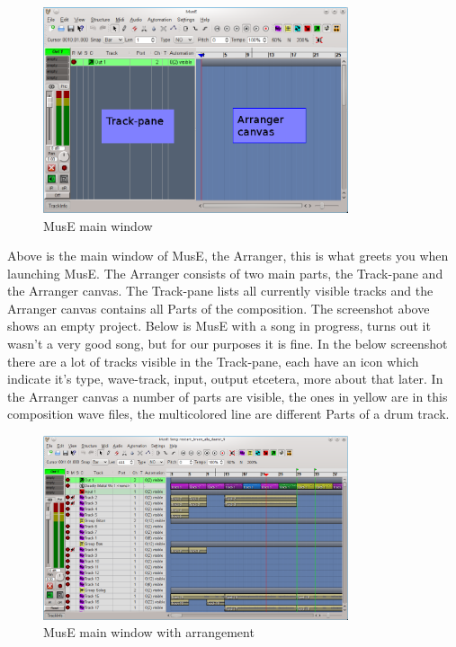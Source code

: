 \documentclass[a4paper]{report}
\newcommand{\screenshotwidth}[0]{0.8\textwidth}
\begin{document}
\label{Main/Arranger} 
\begin{figure}[htp]
\centering \includegraphics[width=\screenshotwidth]
{pics/main_window_annotated} 
\caption{MusE main window}
\label{fig:Main Window} 
\end{figure}
Above is the main window of MusE, the Arranger, this is what greets you
when launching MusE. The Arranger consists of two main parts, the Track-pane
and the Arranger canvas. The Track-pane lists all currently visible tracks
and the Arranger canvas contains all Parts of the composition. The
screenshot above shows an empty project. Below is MusE with a song in
progress, turns out it wasn't a very good song, but for our purposes it
is fine. In the below screenshot there are a lot of tracks visible in the
Track-pane, each have an icon which indicate it's type, wave-track, input,
output etcetera, more about that later. In the Arranger canvas a number of
parts are visible, the ones in yellow are in this composition wave files,
the multicolored line are different Parts of a drum track.
\label{Main/Arranger} 
\begin{figure}[htp]
\centering \includegraphics[width=\screenshotwidth]
{pics/main_window_with_arrangement} 
\caption{MusE main window with arrangement}
\label{fig:Main Window with arrangement} 
\end{figure}
\end{document}
